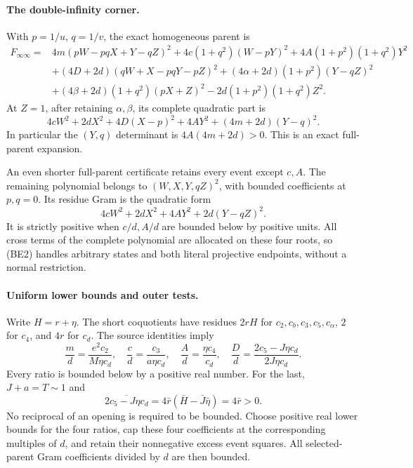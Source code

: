 \paragraph{The double-infinity corner.}
With $p=1/u$, $q=1/v$, the exact homogeneous parent is
\begin{align*}
F_{\infty\infty}={}&4m(pW-pqX+Y-qZ)^2
 +4c(1+q^2)(W-pY)^2+4A(1+p^2)(1+q^2)Y^2\\
&+(4D+2d)(qW+X-pqY-pZ)^2
 +(4\alpha+2d)(1+p^2)(Y-qZ)^2\\
&+(4\beta+2d)(1+q^2)(pX+Z)^2
 -2d(1+p^2)(1+q^2)Z^2.
\end{align*}
At $Z=1$, after retaining $\alpha,\beta$, its complete quadratic part is
\[
 4cW^2+2dX^2+4D(X-p)^2+4AY^2+(4m+2d)(Y-q)^2.
 \tag{BE1}
\]
In particular the $(Y,q)$ determinant is $4A(4m+2d)>0$.
This is an exact full-parent expansion.

An even shorter full-parent certificate retains every event except
$c,A$. The remaining polynomial belongs to $(W,X,Y,qZ)^2$, with bounded
coefficients at $p,q=0$. Its residue Gram is the quadratic form
\[
 4cW^2+2dX^2+4AY^2+2d(Y-qZ)^2.                 \tag{BE2}
\]
It is strictly positive when $c/d,A/d$ are bounded below by positive
units. All cross terms of the complete polynomial are allocated on
these four roots, so (BE2) handles arbitrary states and both literal
projective endpoints, without a normal restriction.

\paragraph{Uniform lower bounds and outer tests.}
Write $H=r+\eta$. The short coquotients have residues $2rH$ for
$c_2,c_b,c_3,c_5,c_\alpha$, $2$ for $c_4$, and $4r$ for $c_d$.
The source identities imply
\[
 \frac md=\frac{e^2c_2}{M\eta c_d},\quad
 \frac cd=\frac{c_3}{a\eta c_d},\quad
 \frac Ad=\frac{\eta c_4}{c_d},\quad
 \frac Dd=\frac{2c_5-J\eta c_d}{2J\eta c_d}.
 \tag{BE3}
\]
Every ratio is bounded below by a positive real number. For the last,
$J+a=T\sim1$ and
\[
 \overline{2c_5-J\eta c_d}=4\bar r(\bar H-\bar J\bar\eta)
 =4\bar r>0.
\]
No reciprocal of an opening is required to be bounded. Choose positive
real lower bounds for the four ratios, cap these four coefficients at
the corresponding multiples of $d$, and retain their nonnegative
excess event squares. All selected-parent Gram coefficients divided
by $d$ are then bounded.

